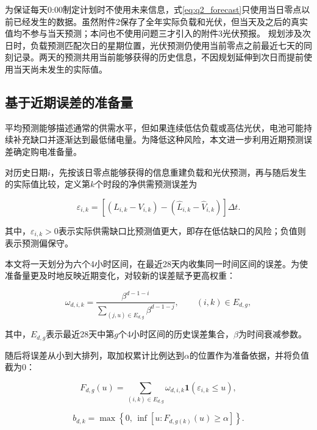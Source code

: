 为保证每天0:00制定计划时不使用未来信息，式\eqref{eq:q2_forecast}只使用当日零点以前已经发生的数据。虽然附件2保存了全年实际负载和光伏，但当天及之后的真实值均不参与当天预测；本问也不使用问题三才引入的附件3光伏预报。
规划涉及次日时，负载预测匹配次日的星期位置，光伏预测仍使用当前零点之前最近七天的同刻记录。两天的预测共用当前能够获得的历史信息，不因规划延伸到次日而提前使用当天尚未发生的实际值。


\subsection{基于近期误差的准备量}

平均预测能够描述通常的供需水平，但如果连续低估负载或高估光伏，电池可能持续补充缺口并逐渐达到最低储电量。为降低这种风险，本文进一步利用近期预测误差确定购电准备量。

对历史日期$i$，先按该日零点能够获得的信息重建负载和光伏预测，再与随后发生的实际值比较，定义第$k$个时段的净供需预测误差为

\begin{equation}
\varepsilon_{i,k}
=
\left[
(L_{i,k}-V_{i,k})
-
(\widehat L_{i,k}-\widehat V_{i,k})
\right]\Delta t .
\label{eq:q2_error}
\end{equation}

其中，$\varepsilon_{i,k}>0$表示实际供需缺口比预测值更大，即存在低估缺口的风险；负值则表示预测偏保守。

本文将一天划分为六个4小时区间，在最近28天内收集同一时间区间的误差。为使准备量更及时地反映近期变化，对较新的误差赋予更高权重：

\begin{equation}
\omega_{d,i,k}
=
\frac{\beta^{d-1-i}}
{\displaystyle
\sum_{(j,u)\in E_{d,g}}
\beta^{d-1-j}},
\qquad
(i,k)\in E_{d,g},
\label{eq:q2_weight}
\end{equation}

其中，$E_{d,g}$表示最近28天中第$g$个4小时区间的历史误差集合，$\beta$为时间衰减参数。

随后将误差从小到大排列，取加权累计比例达到$\alpha$的位置作为准备依据，并将负值截为0：

\begin{equation}
F_{d,g}(u)
=
\sum_{(i,k)\in E_{d,g}}
\omega_{d,i,k}
\mathbf{1}
\left(
\varepsilon_{i,k}\leq u
\right),
\label{eq:q2_cdf}
\end{equation}

\begin{equation}
b_{d,k}
=
\max
\left\{
0,\,
\inf
\left[
u:F_{d,g(k)}(u)\geq\alpha
\right]
\right\}.
\label{eq:q2_reserve}
\end{equation}

